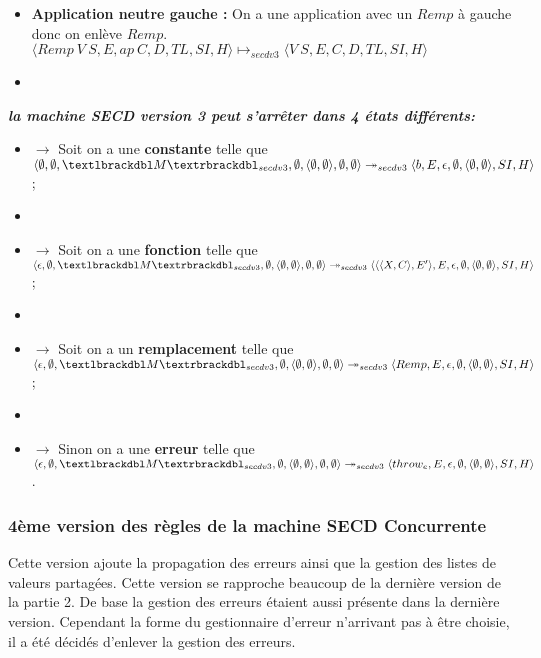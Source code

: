 \documentclass[10pt,a4paper]{report}
\begin{document}
\begin{itemize}
\begin{itemize}
  \item[] \textbf{Application neutre gauche :} On a une application avec un $Remp$ à gauche donc on enlève $Remp$.
    \smallbreak
    $\langle Remp~V~S,E,ap~C,D,TL,SI,H\rangle \longmapsto_{secdv3} \langle V~S,E,C,D,TL,SI,H\rangle$
  \item[]
  \end{itemize}
\end{itemize}
\bigbreak
\bigbreak

\textbf{\textit{la machine SECD version 3 peut s'arrêter dans 4 états différents:}}
\smallbreak
\begin{itemize}
\item[]$\longrightarrow$ Soit on a une \textbf{constante} telle que $\langle \emptyset,\emptyset,\textlbrackdbl M\textrbrackdbl_{secdv3},\emptyset,\langle\emptyset,\emptyset\rangle,\emptyset,\emptyset\rangle \twoheadrightarrow_{secdv3} \langle b,E,\epsilon,\emptyset,\langle\emptyset,\emptyset\rangle,SI,H\rangle$;
\item[]
\item[]$\longrightarrow$ Soit on a une \textbf{fonction} telle que $\langle \epsilon,\emptyset,\textlbrackdbl M\textrbrackdbl_{secdv3},\emptyset,\langle\emptyset,\emptyset\rangle,\emptyset,\emptyset\rangle \twoheadrightarrow_{secdv3} \langle\langle\langle X,C\rangle,E'\rangle,E,\epsilon,\emptyset,\langle\emptyset,\emptyset\rangle,SI,H\rangle$;
\item[]
\item[]$\longrightarrow$ Soit on a un \textbf{remplacement} telle que $\langle \epsilon,\emptyset,\textlbrackdbl M\textrbrackdbl_{secdv3},\emptyset,\langle\emptyset,\emptyset\rangle,\emptyset,\emptyset\rangle \twoheadrightarrow_{secdv3} \langle Remp,E,\epsilon,\emptyset,\langle\emptyset,\emptyset\rangle,SI,H\rangle$;
\item[]
\item[]$\longrightarrow$ Sinon on a une \textbf{erreur} telle que $\langle \epsilon,\emptyset,\textlbrackdbl M\textrbrackdbl_{secdv3},\emptyset,\langle\emptyset,\emptyset\rangle,\emptyset,\emptyset\rangle \twoheadrightarrow_{secdv3} \langle throw_{e},E,\epsilon,\emptyset,\langle\emptyset,\emptyset\rangle,SI,H\rangle$.
\end{itemize}
\newpage



\subsubsection{4ème version des règles de la machine SECD Concurrente}
Cette version ajoute la propagation des erreurs ainsi que la gestion des listes de valeurs partagées. Cette version se rapproche beaucoup de la dernière version de la partie 2. De base la gestion des erreurs étaient aussi présente dans la dernière version. Cependant la forme du gestionnaire d'erreur n'arrivant pas à être choisie, il a été décidés d'enlever la gestion des erreurs.
\bigbreak
\end{document}
